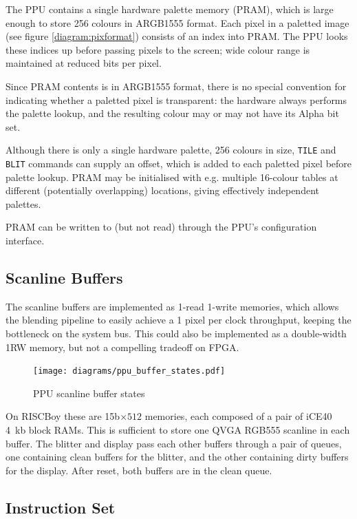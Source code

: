 The PPU contains a single hardware palette memory (PRAM), which is large enough to store 256 colours in ARGB1555 format. Each pixel in a paletted image (see figure \ref{diagram:pixformat}) consists of an index into PRAM. The PPU looks these indices up before passing pixels to the screen; wide colour range is maintained at reduced bits per pixel.

Since PRAM contents is in ARGB1555 format, there is no special convention for indicating whether a paletted pixel is transparent: the hardware always performs the palette lookup, and the resulting colour may or may not have its Alpha bit set.

Although there is only a single hardware palette, 256 colours in size, {\tt TILE} and {\tt BLIT} commands can supply an offset, which is added to each paletted pixel before palette lookup. PRAM may be initialised with e.g. multiple 16-colour tables at different (potentially overlapping) locations, giving effectively independent palettes.

PRAM can be written to (but not read) through the PPU's configuration interface.

\subsection{Scanline Buffers}


The scanline buffers are implemented as 1-read 1-write memories, which allows the blending pipeline to easily achieve a 1 pixel per clock throughput, keeping the bottleneck on the system bus. This could also be implemented as a double-width 1RW memory, but not a compelling tradeoff on FPGA.

\begin{figure}[H]
\centering
\caption{PPU scanline buffer states}
\label{diagram:ppu_buffer_states}
\texttt{[image: diagrams/ppu\_buffer\_states.pdf]}
\end{figure}

On RISCBoy these are 15b$\times512$ memories, each composed of a pair of iCE40 4~kb block RAMs. This is sufficient to store one QVGA RGB555 scanline in each buffer. The blitter and display pass each other buffers through a pair of queues, one containing clean buffers for the blitter, and the other containing dirty buffers for the display. After reset, both buffers are in the clean queue.

\subsection{Instruction Set}

